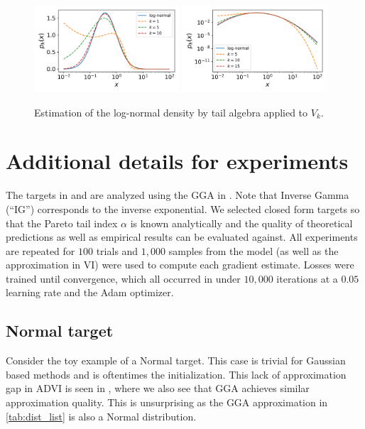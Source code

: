 \documentclass[thesis.tex]{subfiles}
\begin{document}
\begin{figure}[h]
	\centering
	\includegraphics[width=0.48\textwidth]{figures/LogNormal_Bulk.png}
	\includegraphics[width=0.48\textwidth]{figures/LogNormal_Tail.png}
	\caption{Estimation of the log-normal density by tail algebra applied to $V_k$.}
	\label{fig:lognormal}
\end{figure}

\section{Additional details for experiments}



The targets in  and  are analyzed using
the GGA in . Note that Inverse Gamma (``IG'') corresponds
to the inverse exponential. We selected closed form targets so that
the Pareto tail index $\alpha$ is known analytically and the quality
of theoretical predictions as well as empirical results can be evaluated
against. All experiments are repeated for $100$ trials and $1,000$ samples
from the model (as well as the approximation in VI) were used to compute
each gradient estimate. Losses were trained until convergence, which 
all occurred in under $10,000$ iterations at a $0.05$ learning rate and
the Adam \citep{kingma2014adam} optimizer.



\subsection{Normal target}

Consider the toy example of a Normal target. This case is trivial for
Gaussian based methods and is oftentimes the initialization.
This lack of approximation gap in ADVI is seen in ,
where we also see that GGA achieves similar approximation quality.
This is unsurprising as the GGA approximation in \cref{tab:dist_list}
is also a Normal distribution.
\end{document}
